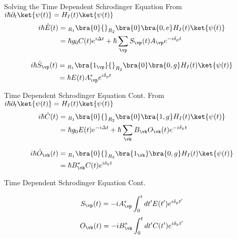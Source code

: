 \begin{frame}{Solving the Time Dependent Schrodinger Equation}
    From $i \hbar \partial_t \ket{\psi (t)} = H_I(t) \ket{\psi (t) }$
   \begin{align}
   \notag
       i \hbar \Dot{E}(t) &=  {}_{R_1}\bra{0}{}_{R_2}\bra{0} \bra{0,e} H_I (t) \ket{\psi (t)}\\
       &=  \hbar g_0 C(t) e^{i\Delta t} + \hbar \sum_{\vp} S_{\vp}(t) A_{\vp} e^{-i \delta_p t } 
   \end{align}
   
   \begin{align}
   \notag
       i \hbar \Dot{S}_{\vp} (t) &=  {}_{R_1}\bra{1_{\vp}}{}_{R_2}\bra{0} \bra{0,g} H_I (t) \ket{\psi (t)}\\
       &= \hbar E(t) A^{*}_{\vp} e^{i \delta_p t} 
   \end{align}

\end{frame}

\begin{frame}{Time Dependent Schrodinger Equation Cont.}
 From $i \hbar \partial_t \ket{\psi (t)} = H_I(t) \ket{\psi (t) }$
 \begin{align}
 \notag
     i \hbar \Dot{C} (t) &= {}_{R_1}\bra{0}{}_{R_2}\bra{0} \bra{1,g} H_I (t) \ket{\psi (t)}\\
     &= \hbar g_0 E(t) e^{- i \Delta t} + \hbar \sum_{\vk} B_{\vk} O_{\vk}(t) e^{-i \delta_k t}
 \end{align}
 
 \begin{align}
    \notag
      i \hbar \Dot{O}_{\vk} (t) &= {}_{R_1}\bra{0}{}_{R_2}\bra{1_{\vk}} \bra{0,g} H_I (t) \ket{\psi (t)}\\
      &= \hbar B^{*}_{\vk} C(t) e^{i\delta_k t} 
 \end{align}
\end{frame}

\begin{frame}{Time Dependent Schrodinger Equation Cont.}

 \begin{equation}
 \label{eq:S_result}
     S_{\vp}(t) = -i A^{*}_{\vp} \int_0^t dt' E(t')  e^{i\delta_p t'}
 \end{equation}
 \begin{equation}
    \label{eq:O_result}
     O_{\vk}(t) = -i B^{*}_{\vk} \int_0^t dt' C(t') e^{i \delta_{k} t'}
 \end{equation}

 
 \end{frame}


